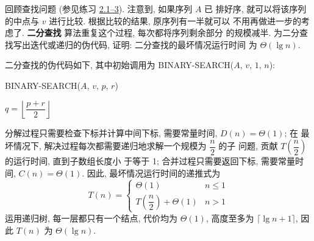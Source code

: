 \documentclass[boxes]{homework}
\begin{document}
\begin{problem}
回顾查找问题 (参见练习 \hyperref[prob:2.1-3]{2.1--3}). 注意到, 如果序列 $A$ 已
排好序, 就可以将该序列的中点与 $v$ 进行比较. 根据比较的结果, 原序列有一半就可以
不用再做进一步的考虑了. \textbf{二分查找} 算法重复这个过程, 每次都将序列剩余部分
的规模减半. 为二分查找写出迭代或递归的伪代码, 证明: 二分查找的最坏情况运行时间
为 $\Theta(\lg n)$.
\end{problem}
\begin{solution}
    二分查找的伪代码如下, 其中初始调用为 BINARY-SEARCH($A$, $v$, $1$, $n$):
    \begin{algo}
        \caption{BINARY-SEARCH($A$, $v$, $p$, $r$)}
        \label{algo:binary-search}

        $q = \left\lfloor \dfrac{ p + r }{ 2 } \right\rfloor$\;
    \end{algo}
    分解过程只需要检查下标并计算中间下标, 需要常量时间, $D(n) = \Theta(1)$; 在
    最坏情况下, 解决过程每次都需要递归地求解一个规模为 $\dfrac{ n }{ 2 }$ 的子
    问题, 贡献 $T \left( \dfrac{ n }{ 2 }\right)$ 的运行时间, 直到子数组长度小
    于等于 1; 合并过程只需要返回下标, 需要常量时间, $C(n) = \Theta(1)$. 因此,
    最坏情况运行时间的递推式为
    \begin{equation}
        \label{eq:5}
        T(n) =
        \begin{cases}
            \Theta(1)                                    & n \leq 1 \\
            T \left( \dfrac{ n }{ 2 }\right) + \Theta(1) & n > 1
        \end{cases}
    \end{equation}
    运用递归树, 每一层都只有一个结点, 代价均为 $\Theta (1)$, 高度至多为
    $\lceil\lg n + 1\rceil$, 因此 $T(n)$ 为 $\Theta(\lg n)$.
\end{solution}
\end{document}

